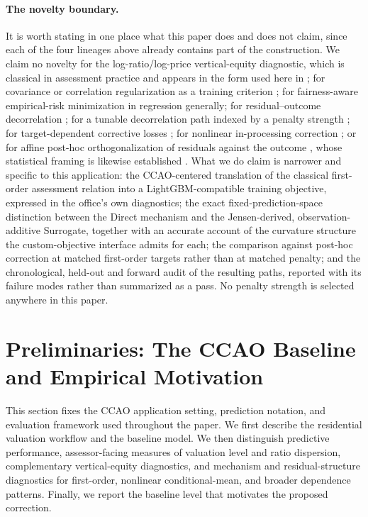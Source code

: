 \documentclass[10pt]{article}
\theoremstyle{definition}
\newcommand{\1}{\mathbf{1}}
\begin{document}
\paragraph{The novelty boundary.}
It is worth stating in one place what this paper does and does not claim, since
each of the four lineages above already contains part of the construction. We claim no
novelty for the log-ratio/log-price vertical-equity diagnostic, which is classical in
assessment practice and appears in the form used here in \textcite{Cheng1974}; for
covariance or correlation regularization as a training criterion
\cite{KomiyamaEtAl2018,TrederEtAl2021}; for fairness-aware empirical-risk minimization in
regression generally; for residual--outcome decorrelation \cite{SmithEtAl2019}; for a
tunable decorrelation path indexed by a penalty strength \cite{TrederEtAl2021}; for
target-dependent corrective losses \cite{WangEtAl2023}; for nonlinear in-processing
correction \cite{RenEtAl2026}; or for affine post-hoc orthogonalization of residuals
against the outcome \cite{BeheshtiEtAl2019}, whose statistical framing is likewise
established \cite{LeeChen2026}. What we do claim is narrower and
specific to this application: the CCAO-centered translation of the classical first-order
assessment relation into a LightGBM-compatible training objective, expressed in the
office's own diagnostics; the exact fixed-prediction-space distinction between the Direct
mechanism and the Jensen-derived, observation-additive Surrogate, together with an accurate
account of the curvature structure the custom-objective interface admits for each; the comparison against
post-hoc correction at matched first-order targets rather than at matched penalty; and the
chronological, held-out and forward audit of the resulting paths, reported with its failure
modes rather than summarized as a pass. No penalty strength is selected anywhere in this
paper.


\section{Preliminaries: The CCAO Baseline and Empirical Motivation}
\label{sec:setting}


This section fixes the CCAO application setting, prediction notation, and evaluation framework used throughout the paper. We first describe the residential valuation workflow and the baseline model. We then distinguish predictive performance, assessor-facing measures of valuation level and ratio dispersion, complementary vertical-equity diagnostics, and mechanism and residual-structure diagnostics for first-order, nonlinear conditional-mean, and broader dependence patterns. Finally, we report the baseline level that motivates the proposed correction.
\end{document}
